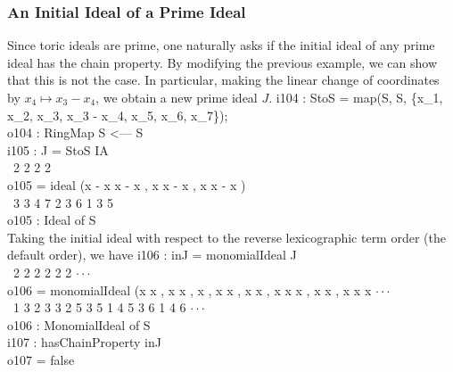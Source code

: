 \subsubsection*{An Initial Ideal of a Prime Ideal}  Since toric ideals are
prime, one naturally asks if the initial ideal of any prime ideal has
the chain property.  By modifying the previous example, we can show
that this is not the case.  In particular, making the linear change of
coordinates by $x_{4} \mapsto x_{3}-x_{4}$, we obtain a new prime
ideal $J$.
\beginOutput
i104 : StoS = map(S, S, \{x_1, x_2, x_3, x_3 - x_4, x_5, x_6, x_7\});\\
\emptyLine
o104 : RingMap S <--- S\\
\endOutput
\beginOutput
i105 : J = StoS IA\\
\emptyLine
\               2           2          2          2\\
o105 = ideal (x  - x x  - x , x x  - x , x x  - x )\\
\               3    3 4    7   2 3    6   1 3    5\\
\emptyLine
o105 : Ideal of S\\
\endOutput
Taking the initial ideal with respect to the reverse lexicographic
term order (the default order), we have
\beginOutput
i106 : inJ = monomialIdeal J\\
\emptyLine
\                                   2     2     2       2     2       2 $\cdot\cdot\cdot$\\
o106 = monomialIdeal (x x , x x , x , x x , x x , x x x , x x , x x x  $\cdot\cdot\cdot$\\
\                       1 3   2 3   3   2 5   3 5   1 4 5   3 6   1 4 6 $\cdot\cdot\cdot$\\
\emptyLine
o106 : MonomialIdeal of S\\
\endOutput
\beginOutput
i107 : hasChainProperty inJ\\
\emptyLine
o107 = false\\
\endOutput


